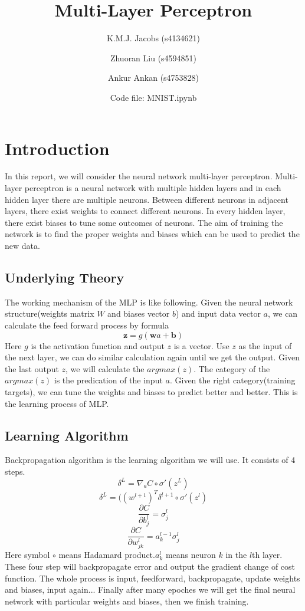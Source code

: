 \documentclass[12pt,a4paper]{article}
\author{K.M.J. Jacobs (s4134621) \and Zhuoran Liu (s4594851) \and Ankur Ankan (s4753828) \and Code file: MNIST.ipynb}
\title{Multi-Layer Perceptron}
\begin{document}
\maketitle

\color{black}
\newpage
\section{Introduction}
In this report, we will consider the neural network multi-layer perceptron. Multi-layer perceptron is a neural network with multiple hidden layers and in each hidden layer there are multiple neurons. Between different neurons in adjacent layers, there exist weights to connect different neurons. In every hidden layer, there exist biases to tune some outcomes of neurons. The aim of training the network is to find the proper weights and biases which can be used to predict the new data.
\subsection{Underlying Theory}
The working mechanism of the MLP is like following. Given the neural network structure(weights matrix $W$ and biases vector $b$) and input data vector $a$, we can calculate the feed forward process by formula
\[\textbf{z} = g(\textbf{w}a + \textbf{b})\]
Here $g$ is the activation function and output $z$ is a vector. Use $z$ as the input of the next layer, we can do similar calculation again until we get the output. Given the last output $z$, we will calculate the $argmax(z)$. The category of the $argmax(z)$ is the predication of the input $a$. Given the right category(training targets), we can tune the weights and biases to predict better and better. This is the learning process of MLP. 
\subsection{Learning Algorithm}
Backpropagation algorithm is the learning algorithm we will use. It consists of 4 steps.
\[\delta^L = \nabla_{a} C \circ \sigma'(z^{L})\]
\[\delta^L = ((w^{l+1})^{T} \delta^{l+1} \circ \sigma'(z^{l})\]
\[\frac{\partial C}{\partial b_{j}^{l}} = \sigma_{j}^{l}\]
\[\frac{\partial C}{\partial w_{jk}^{l}} = a_{k}^{l-1} \sigma_{j}^{l}\]
Here symbol $\circ$ means Hadamard product.$a_k^l$ means neuron $k$ in the $l$th layer.\\
These four step will backpropagate error and output the gradient change of cost function. The whole process is input, feedforward, backpropagate, update weights and biases, input again... Finally after many epoches we will get the final neural network with particular weights and biases, then we finish training.
\newpage
\end{document}

